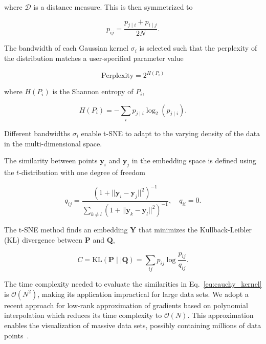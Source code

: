\documentclass[runningheads]{llncs}
\begin{document}
\noindent where $\mathcal{D}$ is a distance measure. This is then symmetrized to

\begin{equation}
p_{ij} = \frac{p_{j \mid i} + p_{i \mid j}}{2N}.
\label{eq:symmetrize}
\end{equation}

The bandwidth of each Gaussian kernel $\sigma_i$ is selected such that the
perplexity of the distribution matches a user-specified parameter value

\begin{equation}
\text{Perplexity} = 2^{H(P_i)}
\end{equation}

\noindent where $H(P_i)$ is the Shannon entropy of $P_i$,

\begin{equation}
H(P_i) = -\sum_i p_{j \mid i} \log_2 (p_{j \mid i}).
\end{equation}

\noindent Different bandwidths $\sigma_i$ enable t-SNE to adapt to the varying
density of the data in the multi-dimensional space.

The similarity between points $\mathbf{y}_i$ and $\mathbf{y}_j$ in the
embedding space is defined using the $t$-distribution with one degree of
freedom

\begin{equation}
q_{ij} = \frac{\left ( 1 + || \mathbf{y}_i - \mathbf{y}_j ||^2 \right )^{-1}}
{\sum_{k \neq l}\left ( 1 + || \mathbf{y}_k - \mathbf{y}_l ||^2 \right )^{-1}},
\quad q_{ii} = 0.
\label{eq:cauchy_kernel}
\end{equation}

The t-SNE method finds an embedding $\mathbf{Y}$ that minimizes the
Kullback-Leibler (KL) divergence between $\mathbf{P}$ and $\mathbf{Q}$,

\begin{equation}
C = \text{KL}(\mathbf{P} \mid \mid \mathbf{Q}) = \sum_{ij} p_{ij} \log \frac{p_{ij}}{q_{ij}}.
\label{eq:kl_divergence}
\end{equation}

The time complexity needed to evaluate the similarities in
Eq.~\ref{eq:cauchy_kernel} is $\mathcal{O}(N^2)$, making its application
impractical for large data sets. We adopt a recent approach
for low-rank approximation of gradients based on polynomial interpolation which
reduces its time complexity to $\mathcal{O}(N)$. This approximation
enables the visualization of massive data sets, possibly containing millions of
data points~\cite{Linderman2019}.
\end{document}
